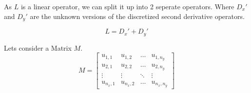 \documentclass{article}
\begin{document}
As $L$ is a linear operator, we can split it up into 2 seperate operators. Where $D_x'$ and $D_y'$ are the unknown versions of the discretized second derivative operators.

\begin{equation}
    L = D_x' + D_y'
\end{equation}

Lets consider a Matrix $M$.
\begin{equation}
    M = \begin{bmatrix}
        u_{1,1} & u_{1,2} & \dots & u_{1,n_y} \\
        u_{2,1} & u_{2,2} & \dots & u_{2,n_y} \\
        \vdots & \vdots & \ddots & \vdots \\
        u_{n_x,1} & u_{n_x,2} & \dots & u_{n_x,n_y}
    \end{bmatrix}
\end{equation}
\end{document}
